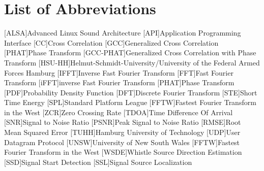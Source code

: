 \chapter*{List of Abbreviations}
\label{sec:abbreviations}

\begin{acronym}[HSU-HH]
  [ALSA]{Advanced Linux Sound Architecture}
  [API]{Application Programming Interface}
  [CC]{Cross Correlation}
  [GCC]{Generalized Cross Correlation}
  [PHAT]{Phase Transform}
  [GCC-PHAT]{Generalized Cross Correlation with Phase Transform}
  [HSU-HH]{Helmut-Schmidt-University/University of the Federal Armed Forces Hamburg}
  [IFFT]{Inverse Fast Fourier Transform}
  [FFT]{Fast Fourier Transform}
  [iFFT]{inverse Fast Fourier Transform}
  [PHAT]{Phase Transform}
  [PDF]{Probability Density Function}
  [DFT]{Discrete Fourier Transform}
  [STE]{Short Time Energy}
  [SPL]{Standard Platform League}
  [FFTW]{Fastest Fourier Transform in the West}
  [ZCR]{Zero Crossing Rate}
  [TDOA]{Time Difference Of Arrival}
  [SNR]{Signal to Noise Ratio}
  [PSNR]{Peak Signal to Noise Ratio}
  [RMSE]{Root Mean Squared Error}
  [TUHH]{Hamburg University of Technology}
  [UDP]{User Datagram Protocol}
  [UNSW]{University of New South Wales}
  [FFTW]{Fastest Fourier Transform in the West}
  [WSDE]{Whistle Source Direction Estimation}
  [SSD]{Signal Start Detection}
  [SSL]{Signal Source Localization}
\end{acronym}

